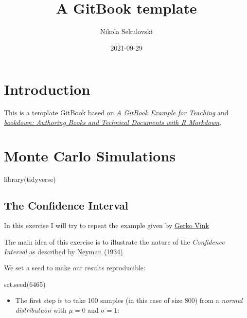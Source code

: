 \documentclass[
]{book}
\title{A GitBook template}
\author{Nikola Sekulovski}
\date{2021-09-29}
\newenvironment{Shaded}{\begin{snugshade}}{\end{snugshade}}
\newcommand{\DecValTok}[1]{\textcolor[rgb]{0.00,0.00,0.81}{#1}}
\newcommand{\FunctionTok}[1]{\textcolor[rgb]{0.00,0.00,0.00}{#1}}
\newcommand{\NormalTok}[1]{#1}
\providecommand{\tightlist}{%
  \setlength{\itemsep}{0pt}\setlength{\parskip}{0pt}}
\begin{document}
\maketitle

{
\setcounter{tocdepth}{1}
\tableofcontents
}
\hypertarget{introduction}{%
\chapter{Introduction}\label{introduction}}

This is a template GitBook based on \href{https://cjvanlissa.github.io/gitbook-demo/}{\emph{A GitBook Example for Teaching}} and \href{https://bookdown.org/yihui/bookdown/}{\emph{bookdown: Authoring Books and Technical Documents with R Markdown}}.

\hypertarget{monte-carlo-simulations}{%
\chapter{Monte Carlo Simulations}\label{monte-carlo-simulations}}

\begin{Shaded}
\begin{Highlighting}[]
\FunctionTok{library}\NormalTok{(tidyverse)}
\end{Highlighting}
\end{Shaded}

\hypertarget{the-confidence-interval}{%
\section{The Confidence Interval}\label{the-confidence-interval}}

In this exercise I will try to repeat the example given by \href{https://www.gerkovink.com/markup/Wk1/Solution_to_Ex1.html}{Gerko Vink}

The main idea of this exercise is to illustrate the nature of the \emph{Confidence Interval} as described by \href{http://www.stat.cmu.edu/~brian/905-2008/papers/neyman-1934-jrss.pdf}{Neyman (1934)}

We set a seed to make our results reproducible:

\begin{Shaded}
\begin{Highlighting}[]
\FunctionTok{set.seed}\NormalTok{(}\DecValTok{6465}\NormalTok{)}
\end{Highlighting}
\end{Shaded}

\begin{itemize}
\tightlist
\item
  The first step is to take 100 samples (in this case of size 800) from a \emph{normal distributuon} with \(\mu = 0\) and \(\sigma = 1\):
\end{itemize}
\end{document}

